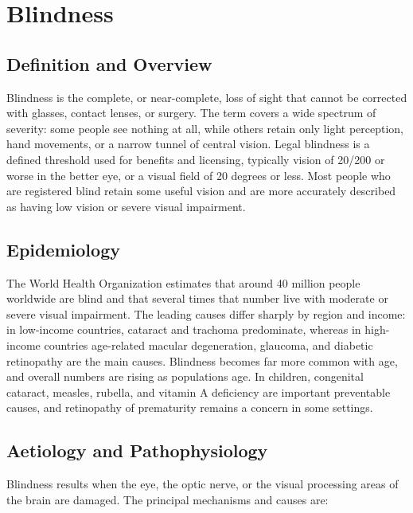 \chapter{Blindness}

\section*{Definition and Overview}
Blindness is the complete, or near-complete, loss of sight that cannot be corrected with glasses, contact lenses, or surgery. The term covers a wide spectrum of severity: some people see nothing at all, while others retain only light perception, hand movements, or a narrow tunnel of central vision. Legal blindness is a defined threshold used for benefits and licensing, typically vision of 20/200 or worse in the better eye, or a visual field of 20 degrees or less. Most people who are registered blind retain some useful vision and are more accurately described as having low vision or severe visual impairment.

\section*{Epidemiology}
The World Health Organization estimates that around 40 million people worldwide are blind and that several times that number live with moderate or severe visual impairment. The leading causes differ sharply by region and income: in low-income countries, cataract and trachoma predominate, whereas in high-income countries age-related macular degeneration, glaucoma, and diabetic retinopathy are the main causes. Blindness becomes far more common with age, and overall numbers are rising as populations age. In children, congenital cataract, measles, rubella, and vitamin A deficiency are important preventable causes, and retinopathy of prematurity remains a concern in some settings.

\section*{Aetiology and Pathophysiology}
Blindness results when the eye, the optic nerve, or the visual processing areas of the brain are damaged. The principal mechanisms and causes are:

